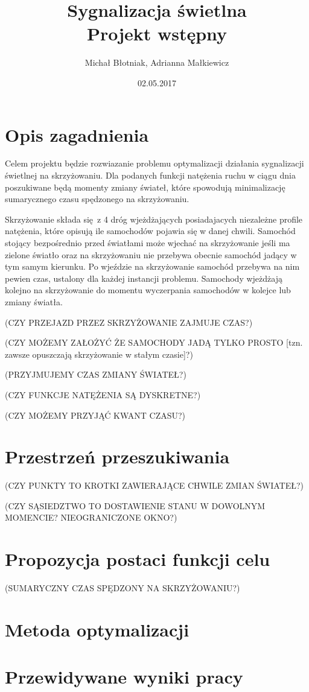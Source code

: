 \documentclass[a4paper]{article}
\title {
  Sygnalizacja świetlna
  \\ Projekt wstępny
}
\date{02.05.2017}
\author{Michał Błotniak, Adrianna Małkiewicz}
\begin{document}
\maketitle

\justify

\section{Opis zagadnienia}

Celem projektu będzie rozwiazanie problemu optymalizacji działania sygnalizacji świetlnej na skrzyżowaniu. Dla podanych
funkcji natężenia ruchu w ciągu dnia poszukiwane będą momenty zmiany świateł, które spowodują minimalizację
sumarycznego czasu spędzonego na skrzyżowaniu.

Skrzyżowanie składa się z 4 dróg wjeżdżających posiadajacych niezależne profile natężenia, które opisują ile samochodów
pojawia się w danej chwili. Samochód stojący bezpośrednio przed światłami może wjechać na skrzyżowanie jeśli ma zielone
światło oraz na skrzyżowaniu nie przebywa obecnie samochód jadący w tym samym kierunku. Po wjeździe na skrzyżowanie
samochód przebywa na nim pewien czas, ustalony dla każdej instancji problemu. Samochody wjeżdżają kolejno na
skrzyżowanie do momentu wyczerpania samochodów w kolejce lub zmiany światła.

(CZY PRZEJAZD PRZEZ SKRZYŻOWANIE ZAJMUJE CZAS?)

(CZY MOŻEMY ZAŁOŻYĆ ŻE SAMOCHODY JADĄ TYLKO PROSTO [tzn. zawsze opuszczają skrzyżowanie w stałym czasie]?)

(PRZYJMUJEMY CZAS ZMIANY ŚWIATEŁ?)

(CZY FUNKCJE NATĘŻENIA SĄ DYSKRETNE?)

(CZY MOŻEMY PRZYJĄĆ KWANT CZASU?)

\section{Przestrzeń przeszukiwania}
(CZY PUNKTY TO KROTKI ZAWIERAJĄCE CHWILE ZMIAN ŚWIATEŁ?)

(CZY SĄSIEDZTWO TO DOSTAWIENIE STANU W DOWOLNYM MOMENCIE? NIEOGRANICZONE OKNO?)

\section{Propozycja postaci funkcji celu}
(SUMARYCZNY CZAS SPĘDZONY NA SKRZYŻOWANIU?)

\section{Metoda optymalizacji}

\section{Przewidywane wyniki pracy}
\end{document}
